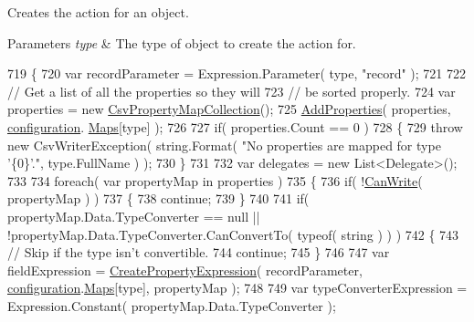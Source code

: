 Creates the action for an object. 


\begin{DoxyParams}{Parameters}
{\em type} & The type of object to create the action for.\\
\hline
\end{DoxyParams}

\begin{DoxyCode}
719         \{
720             var recordParameter = Expression.Parameter( type, \textcolor{stringliteral}{"record"} );
721 
722             \textcolor{comment}{// Get a list of all the properties so they will}
723             \textcolor{comment}{// be sorted properly.}
724             var properties = \textcolor{keyword}{new} \hyperlink{a00049}{CsvPropertyMapCollection}();
725             \hyperlink{a00059_ac913b615ee170ad2b84137c4d5c7eda2}{AddProperties}( properties, \hyperlink{a00059_a0711748c9a399cfbcbad93857304fc67}{configuration}.
      \hyperlink{a00041_a9119c99f5dafba985718f631f7bfa16a}{Maps}[type] );
726 
727             \textcolor{keywordflow}{if}( properties.Count == 0 )
728             \{
729                 \textcolor{keywordflow}{throw} \textcolor{keyword}{new} CsvWriterException( \textcolor{keywordtype}{string}.Format( \textcolor{stringliteral}{"No properties are mapped for type '\{0\}'."}, 
      type.FullName ) );
730             \}
731 
732             var delegates = \textcolor{keyword}{new} List<Delegate>();
733 
734             \textcolor{keywordflow}{foreach}( var propertyMap \textcolor{keywordflow}{in} properties )
735             \{
736                 \textcolor{keywordflow}{if}( !\hyperlink{a00059_a6085ddfd5e9c626d1d9f575ff21a0599}{CanWrite}( propertyMap ) )
737                 \{
738                     \textcolor{keywordflow}{continue};
739                 \}
740 
741                 \textcolor{keywordflow}{if}( propertyMap.Data.TypeConverter == null || !propertyMap.Data.TypeConverter.CanConvertTo(
       typeof( \textcolor{keywordtype}{string} ) ) )
742                 \{
743                     \textcolor{comment}{// Skip if the type isn't convertible.}
744                     \textcolor{keywordflow}{continue};
745                 \}
746 
747                 var fieldExpression = \hyperlink{a00059_aada073c07b3fd07dba434855ffb18b75}{CreatePropertyExpression}( recordParameter, 
      \hyperlink{a00059_a0711748c9a399cfbcbad93857304fc67}{configuration}.\hyperlink{a00041_a9119c99f5dafba985718f631f7bfa16a}{Maps}[type], propertyMap );
748 
749                 var typeConverterExpression = Expression.Constant( propertyMap.Data.TypeConverter );

\end{DoxyCode}
